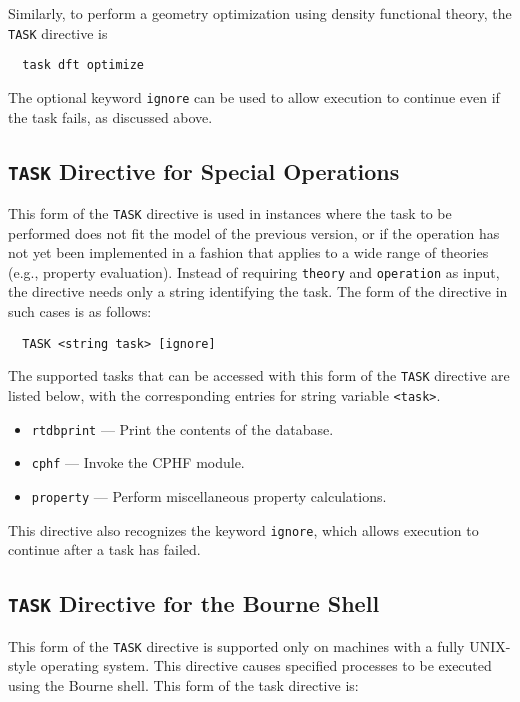 Similarly, to perform a geometry optimization using density functional
theory, the \verb+TASK+ directive is
\begin{verbatim}
  task dft optimize
\end{verbatim}

The optional keyword \verb+ignore+ can be used to allow execution to
continue even if the task fails, as discussed above.

\subsection{{\tt TASK} Directive for Special Operations}

This form of the \verb+TASK+ directive is used in instances where the
task to be performed does not fit the model of the previous version, or
if the operation has not yet been implemented in a fashion that
applies to a wide range of theories (e.g., property evaluation).
Instead of requiring \verb+theory+ and \verb+operation+ as input, the
directive needs only a string identifying the task.  The form of the
directive in such cases is as follows:

\begin{verbatim}
  TASK <string task> [ignore]
\end{verbatim}

The supported tasks that can be accessed with this form of the \verb+TASK+
directive are listed
below, with the corresponding entries for string variable \verb+<task>+.

\begin{itemize}
  \item \verb+rtdbprint+ --- Print the contents of the database.
  \item \verb+cphf+ --- Invoke the CPHF module.
  \item \verb+property+ --- Perform miscellaneous property calculations.
\end{itemize}

This directive also recognizes the keyword \verb+ignore+, which allows
execution to continue after a task has failed.

\subsection{{\tt TASK} Directive for the Bourne Shell}

This form of the \verb+TASK+ directive is supported only on machines
with a fully UNIX-style operating system.  This directive causes
specified processes to be executed using the Bourne shell.  This form
of the task directive is:

